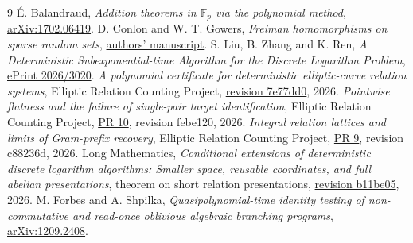 \documentclass[11pt]{article}
\begin{document}
\begin{thebibliography}{9}
 {\'E}. Balandraud, \emph{Addition theorems in $\mathbb F_p$ via the polynomial method}, \href{https://arxiv.org/abs/1702.06419}{arXiv:1702.06419}.
 D. Conlon and W. T. Gowers, \emph{Freiman homomorphisms on sparse random sets}, \href{https://www.its.caltech.edu/~dconlon/homomorphisms.pdf}{authors' manuscript}.
 S. Liu, B. Zhang and K. Ren, \emph{A Deterministic Subexponential-time Algorithm for the Discrete Logarithm Problem}, \href{https://eprint.iacr.org/2026/3020}{ePrint 2026/3020}.
 \emph{A polynomial certificate for deterministic elliptic-curve relation systems}, Elliptic Relation Counting Project, \href{https://github.com/davidiach/elliptic-relation-counting/tree/7e77dd0fcd222dd39780d4e1d5eb1c464c3b3a87}{revision 7e77dd0}, 2026.
 \emph{Pointwise flatness and the failure of single-pair target identification}, Elliptic Relation Counting Project, \href{https://github.com/davidiach/elliptic-relation-counting/pull/10}{PR 10}, revision febe120, 2026.
 \emph{Integral relation lattices and limits of Gram-prefix recovery}, Elliptic Relation Counting Project, \href{https://github.com/davidiach/elliptic-relation-counting/pull/9}{PR 9}, revision c88236d, 2026.
 Long Mathematics, \emph{Conditional extensions of deterministic discrete logarithm algorithms: Smaller space, reusable coordinates, and full abelian presentations}, theorem on short relation presentations, \href{https://github.com/long-mathematics/deterministic-discrete-logarithms/tree/b11be05092e0f95862d9c7a8aef57e27e9a231c2}{revision b11be05}, 2026.
 M. Forbes and A. Shpilka, \emph{Quasipolynomial-time identity testing of non-commutative and read-once oblivious algebraic branching programs}, \href{https://arxiv.org/abs/1209.2408}{arXiv:1209.2408}.
\end{thebibliography}
\end{document}
